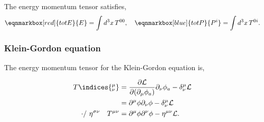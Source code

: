 \vspace{-8mm}
The \textsf{energy momentum tensor} satisfies,
\begin{equation}
  \eqnmarkbox[red]{totE}{E} = \int d^3 x\, T^{00}, \quad \eqnmarkbox[blue]{totP}{P^i} = \int d^3 x\, T^{0i}. 
\end{equation}

\subsubsection{Klein-Gordon equation}
The energy momentum tensor for the Klein-Gordon equation is, 
\begin{derivation}
  \begin{equation}
    \begin{aligned}
      T\indices{^\mu_\nu} &= \frac{\partial\mathcal{L}}{\partial(\partial_\mu\phi_a)}\partial_\nu\phi_a - \delta^\mu_\nu\mathcal{L}\\
                          &= \partial^\mu\phi\partial_\nu\phi - \delta^\mu_\nu\mathcal{L}\\
      \text{$\cdot /$ $\eta^{\sigma\nu}$}\quad T^{\mu\nu} &= \partial^\mu\phi\partial^\nu\phi - \eta^{\mu\nu}\mathcal{L}.
    \end{aligned}
  \end{equation}
\end{derivation}

